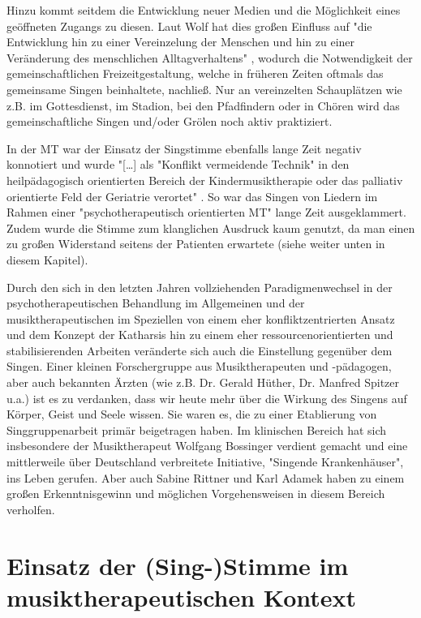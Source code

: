 Hinzu kommt seitdem die Entwicklung neuer Medien und die Möglichkeit eines geöffneten Zugangs zu diesen. Laut Wolf hat dies großen Einfluss auf "die Entwicklung hin zu einer Vereinzelung der Menschen und hin zu einer Veränderung des menschlichen Alltagverhaltens" \autocite[10]{wolf2012}, wodurch die Notwendigkeit der gemeinschaftlichen Freizeitgestaltung, welche in früheren Zeiten oftmals das gemeinsame Singen beinhaltete, nachließ. Nur an vereinzelten Schauplätzen wie z.B. im Gottesdienst, im Stadion, bei den Pfadfindern oder in Chören wird das gemeinschaftliche Singen und/oder Grölen noch aktiv praktiziert.

In der MT war der Einsatz der Singstimme ebenfalls lange Zeit negativ konnotiert und wurde "[\ldots] als "Konflikt vermeidende Technik" in den heilpädagogisch orientierten Bereich der Kindermusiktherapie oder das palliativ orientierte Feld der Geriatrie verortet" \autocite[10]{wolf2012}. So war das Singen von Liedern im Rahmen einer "psychotherapeutisch orientierten MT" lange Zeit ausgeklammert. Zudem wurde die Stimme zum klanglichen Ausdruck kaum genutzt, da man einen zu großen Widerstand seitens der Patienten erwartete (siehe weiter unten in diesem Kapitel). 

Durch den sich in den letzten Jahren vollziehenden Paradigmenwechsel in der psychotherapeutischen Behandlung im Allgemeinen und der musiktherapeutischen im Speziellen von einem eher konfliktzentrierten Ansatz und dem Konzept der Katharsis hin zu einem eher ressourcenorientierten und stabilisierenden Arbeiten veränderte sich auch die Einstellung gegenüber dem Singen\autocite[vgl.][11]{wolf2012}. Einer kleinen Forschergruppe aus Musiktherapeuten und -pädagogen, aber auch bekannten Ärzten (wie z.B. Dr. Gerald Hüther, Dr. Manfred Spitzer u.a.) ist es zu verdanken, dass wir heute mehr über die Wirkung des Singens auf Körper, Geist und Seele wissen. Sie waren es, die zu einer Etablierung von Singgruppenarbeit primär beigetragen haben. Im klinischen Bereich hat sich insbesondere der Musiktherapeut Wolfgang Bossinger verdient gemacht und eine mittlerweile über Deutschland verbreitete Initiative, "Singende Krankenhäuser", ins Leben gerufen. Aber auch Sabine Rittner und Karl Adamek haben zu einem großen Erkenntnisgewinn und möglichen Vorgehensweisen in diesem Bereich verholfen.

\section{Einsatz der (Sing-)Stimme im musiktherapeutischen Kontext}

